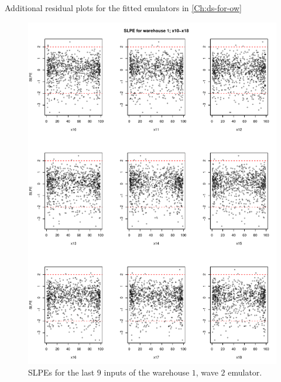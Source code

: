 \begin{chapter}{Additional residual plots  for the fitted emulators in \cref{Ch:ds-for-ow} \label{App:resid}}
\begin{figure}
  \centering
  \includegraphics[width=\textwidth]{fig-app-ds/w2-w1-2.pdf}
  \caption{SLPEs for the last $9$ inputs of the warehouse $1$, wave $2$ emulator.}
\end{figure}
\begin{figure}
  \centering

\end{figure}
\end{chapter}
